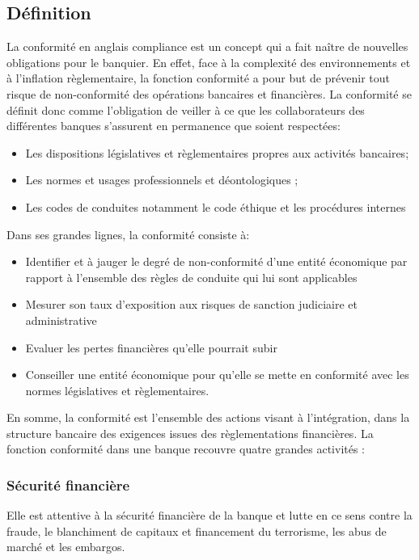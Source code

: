 \subsection{Définition}
La conformité en anglais compliance est un concept qui a fait naître de 
nouvelles obligations pour le banquier. En effet, face à la complexité des
environnements et à \og l'inflation règlementaire\fg,  la fonction 
conformité a pour but de prévenir tout risque de non-conformité des opérations
bancaires et financières. La conformité se définit donc comme l’obligation 
de veiller à ce que les collaborateurs des différentes banques s’assurent en
permanence que soient respectées:
\begin{itemize}
  \item Les dispositions législatives et règlementaires propres aux activités
    bancaires;
  \item Les normes et usages professionnels et déontologiques ;
   \item Les codes de conduites notamment le code éthique et les procédures internes
\end{itemize}

Dans ses grandes lignes, la conformité consiste à:
\begin{itemize}
  \item Identifier et à jauger le degré de non-conformité d’une entité 
    économique par rapport à l’ensemble des règles de conduite qui lui sont
    applicables
  \item Mesurer son taux d’exposition aux risques de sanction judiciaire et
    administrative
  \item Evaluer les pertes financières qu’elle pourrait subir
  \item Conseiller une entité économique pour qu’elle se mette en 
    conformité avec les normes législatives et règlementaires.
\end{itemize}

En somme, la conformité est l’ensemble des actions visant
à l’intégration, dans la structure bancaire des exigences issues des 
règlementations financières.  La fonction conformité dans une banque
recouvre quatre grandes activités :

\subsubsection{Sécurité financière}
Elle est attentive à la sécurité financière de la banque et lutte en ce sens 
contre la fraude, le blanchiment de capitaux et financement du terrorisme, 
les abus de marché et les embargos.

